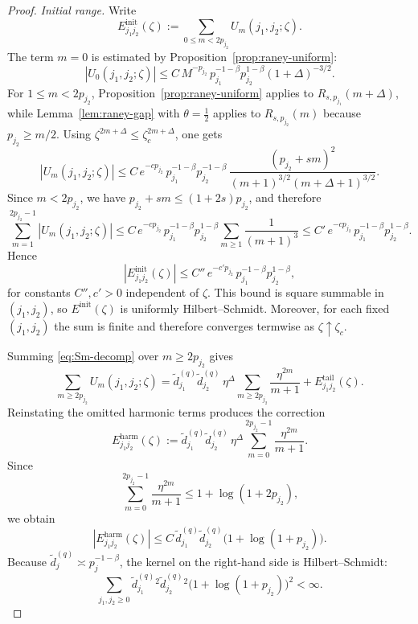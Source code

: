 \documentclass[10pt,a4paper]{amsart}
\begin{document}
\begin{proof}
	\smallskip
	\noindent\emph{Initial range.}
	Write
	\[
		E^{\mathrm{init}}_{j_1j_2}(\zeta):=\sum_{0\le m<2p_{j_2}}U_m(j_1,j_2;\zeta).
	\]
	The term \(m=0\) is estimated by Proposition~\ref{prop:raney-uniform}:
	\[
		|U_0(j_1,j_2;\zeta)|
		\le
		C\,M^{-p_{j_2}}\,p_{j_1}^{-1-\beta}p_{j_2}^{1-\beta}(1+\Delta)^{-3/2}.
	\]
	For \(1\le m<2p_{j_2}\), Proposition~\ref{prop:raney-uniform} applies to
	\(R_{s,p_{j_1}}(m+\Delta)\), while Lemma~\ref{lem:raney-gap} with
	\(\theta=\frac12\) applies to \(R_{s,p_{j_2}}(m)\) because
	\(p_{j_2}\ge m/2\).  Using \(\zeta^{2m+\Delta}\le \zeta_c^{2m+\Delta}\), one gets
	\[
		|U_m(j_1,j_2;\zeta)|
		\le
		C\,e^{-c p_{j_2}}\,
		p_{j_1}^{-1-\beta}p_{j_2}^{-1-\beta}\,
		\frac{(p_{j_2}+sm)^2}{(m+1)^{3/2}(m+\Delta+1)^{3/2}}.
	\]
	Since \(m<2p_{j_2}\), we have \(p_{j_2}+sm\le (1+2s)p_{j_2}\), and therefore
	\[
		\sum_{m=1}^{2p_{j_2}-1}|U_m(j_1,j_2;\zeta)|
		\le
		C\,e^{-c p_{j_2}}\,
		p_{j_1}^{-1-\beta}p_{j_2}^{1-\beta}
		\sum_{m\ge1}\frac{1}{(m+1)^3}
		\le
		C'\,e^{-c p_{j_2}}\,p_{j_1}^{-1-\beta}p_{j_2}^{1-\beta}.
	\]
	Hence
	\[
		|E^{\mathrm{init}}_{j_1j_2}(\zeta)|
		\le
		C''\,e^{-c' p_{j_2}}\,p_{j_1}^{-1-\beta}p_{j_2}^{1-\beta},
	\]
	for constants \(C'',c'>0\) independent of \(\zeta\).  This bound is square
	summable in \((j_1,j_2)\), so \(E^{\mathrm{init}}(\zeta)\) is uniformly
	Hilbert--Schmidt.  Moreover, for each fixed \((j_1,j_2)\) the sum is finite and
	therefore converges termwise as \(\zeta\uparrow\zeta_c\).

	Summing \eqref{eq:Sm-decomp} over \(m\ge2p_{j_2}\) gives
	\[
		\sum_{m\ge2p_{j_2}}
		U_m(j_1,j_2;\zeta)
		=
		\widetilde d^{(q)}_{j_1}\widetilde d^{(q)}_{j_2}\,\eta^\Delta
		\sum_{m\ge2p_{j_2}}\frac{\eta^{2m}}{m+1}
		+
		E^{\mathrm{tail}}_{j_1j_2}(\zeta).
	\]
	Reinstating the omitted harmonic terms produces the correction
	\[
		E^{\mathrm{harm}}_{j_1j_2}(\zeta)
		:=
		\widetilde d^{(q)}_{j_1}\widetilde d^{(q)}_{j_2}\,\eta^\Delta
		\sum_{m=0}^{2p_{j_2}-1}\frac{\eta^{2m}}{m+1}.
	\]
	Since
	\[
		\sum_{m=0}^{2p_{j_2}-1}\frac{\eta^{2m}}{m+1}
		\le
		1+\log(1+2p_{j_2}),
	\]
	we obtain
	\[
		|E^{\mathrm{harm}}_{j_1j_2}(\zeta)|
		\le
		C\,\widetilde d^{(q)}_{j_1}\widetilde d^{(q)}_{j_2}\bigl(1+\log(1+p_{j_2})\bigr).
	\]
	Because \(\widetilde d^{(q)}_j\asymp p_j^{-1-\beta}\), the kernel on the
	right-hand side is Hilbert--Schmidt:
	\[
		\sum_{j_1,j_2\ge0}
		\widetilde d^{(q)}_{j_1}{}^2\widetilde d^{(q)}_{j_2}{}^2
		\bigl(1+\log(1+p_{j_2})\bigr)^2
		<\infty.
	\]


\end{proof}
\end{document}
